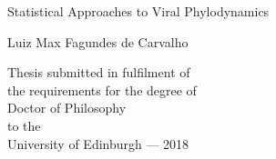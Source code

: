 \thispagestyle{empty}

\begin{minipage}{\textwidth}
\end{minipage}
\begin{center}
\vspace{2cm}
{ \Huge Statistical Approaches to Viral Phylodynamics
  \par
  \vspace{0.5cm} 
{\Large Luiz Max Fagundes de Carvalho \par}
}
\end{center}
\vfill
\begin{center}
\vspace{6cm}    
\centerline{}
\vspace{0.5cm}
Thesis submitted in fulfilment of\\
the requirements for the degree of\\ 
Doctor of Philosophy\\ 
to the\\
University of Edinburgh --- 2018
\end{center}

\newpage
\thispagestyle{empty}